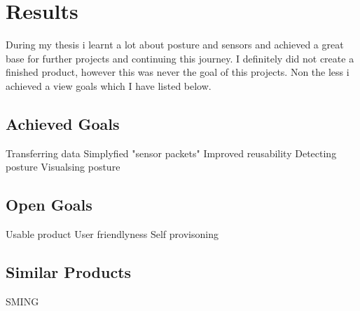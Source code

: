 \chapter*{Results}
\label{chap:Results}
\setcounter{section}{0}

During my thesis i learnt a lot about posture and sensors and achieved a great base for further projects and continuing this journey. I definitely did not create a finished product, however this was never the goal of this projects. Non the less i achieved a view goals which I have listed below.

\section{Achieved Goals}

Transferring data
Simplyfied "sensor packets"
Improved reusability
Detecting posture
Visualsing posture


\section{Open Goals}

Usable product
User friendlyness
Self provisoning

\section{Similar Products}

SMING

